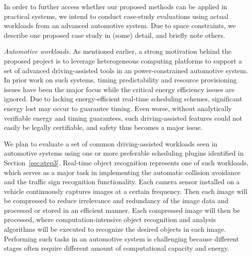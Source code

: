 In order to further access whether our proposed methods can be applied in practical systems, we intend to conduct case-study evaluations using actual workloads from an advanced automotive system. Due to space constraints, we describe one proposed case study in (some) detail, and briefly note others.

\textit{Automotive workloads.} As mentioned earlier, a strong motivation behind the proposed project is to leverage heterogeneous computing platforms to support a set of advanced driving-assisted tools in an power-constrained automotive system. In prior work on such systems, timing predictability and resource provisioning issues have been the major focus while the critical energy efficiency issues are ignored. Due to lacking energy-efficient real-time scheduling schemes, significant energy lost may occur to guarantee timing. Even worse, without analytically verifiable energy and timing  guarantees, such driving-assisted features could not easily be legally certifiable, and safety thus becomes a major issue. 


We plan to evaluate a set of common driving-assisted workloads seen in automotive systems using one or more preferable scheduling plugins identified in Section~\ref{sec:step3}. Real-time object recognition represents one of such workloads, which serves as a major task in implementing the automatic collision avoidance and the traffic sign recognition functionality. %
Each camera sensor installed on a vehicle continuously captures images at a certain frequency. Then each image will be compressed to reduce irrelevance and redundancy of the image data and processed or stored in an efficient manner. Each compressed image will then be processed, where computation-intensive object recognition and analysis algorithms will be executed to recognize the desired objects in each image. Performing such tasks in an automotive system is challenging because different stages often require different amount of computational capacity and energy.  

